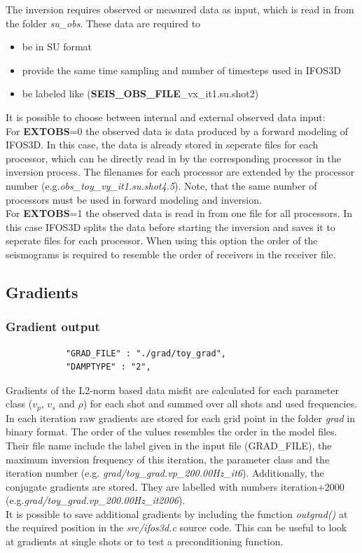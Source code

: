 The inversion requires observed or measured data as input, which is read in from the folder \textit{su\_obs}. These data are required to
\begin{itemize}
 \item be in SU format
 \item provide the same time sampling and number of timesteps used in IFOS3D
 \item be labeled like  (\textbf{SEIS\_OBS\_FILE}\_vx\_it1.su.shot2)
\end{itemize}
It is possible to choose between internal and external observed data input:\\
For \textbf{EXTOBS}=0 the observed data is data produced by a forward modeling of IFOS3D. In this case, the data is already stored in seperate files for each processor, which can be directly read in by the corresponding processor in the inversion process. The filenames for each processor are extended by the processor number (e.g.\textit{obs\_toy\_vy\_it1.su.shot4.5}). Note, that the same number of processors must be used in forward modeling and inversion. \\
For \textbf{EXTOBS}=1 the observed data is read in from one file for all processors. In this case IFOS3D splits the data before starting the inversion and saves it to seperate files for each processor. When using this option the order of the seismograms is required to resemble the order of receivers in the receiver file.
\subsection{Gradients}
\subsubsection*{Gradient output}
\begin{verbatim}
 			"GRAD_FILE" : "./grad/toy_grad",
 			"DAMPTYPE" : "2",
\end{verbatim}

Gradients of the L2-norm based data misfit are calculated for each parameter class ($v_p$, $v_s$ and $\rho$) for each shot and summed over all shots and used frequencies. In each iteration raw gradients are stored for each grid point in the folder \textit{grad} in binary format. The order of the values resembles the order in the model files. Their file name include the label given in the input file (GRAD\_FILE), the maximum inversion frequency of this iteration, the parameter class and the iteration number (e.g. \textit{grad/toy\_grad.vp\_200.00Hz\_it6}). Additionally, the conjugate gradients are stored. They are labelled with numbers iteration+2000 (e.g.\textit{grad/toy\_grad.vp\_200.00Hz\_it2006}). \\
It is possible to save additional gradients by including the function \textit{outgrad()} at the required position in the \textit{src/ifos3d.c} source code. This can be useful to look at gradients at single shots or to test a preconditioning function.
